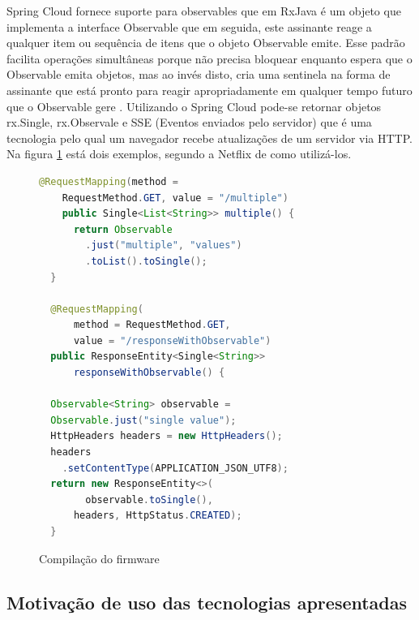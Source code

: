 \documentclass[journal]{IEEEtran}
\begin{document}
Spring Cloud fornece suporte para observables que em RxJava é um objeto que implementa a interface Observable que em seguida, este assinante reage a qualquer item ou sequência de itens que o objeto Observable emite. Esse padrão facilita operações simultâneas porque não precisa bloquear enquanto espera que o Observable emita objetos, mas ao invés disto, cria uma sentinela na forma de assinante que está pronto para reagir apropriadamente em qualquer tempo futuro que o Observable gere \cite{reactivex2017}. Utilizando o Spring Cloud pode-se retornar objetos rx.Single, rx.Observale e SSE (Eventos enviados pelo servidor) que é uma tecnologia pelo qual um navegador recebe atualizações de um servidor via HTTP. Na figura \ref{alg:vintedois} está dois exemplos, segundo a Netflix \cite{netflix2017SpringCloud} de como utilizá-los.

\begin{figure}[h]
\centering

\begin{lstlisting}[language=Java]
  @RequestMapping(method =
    RequestMethod.GET, value = "/multiple")
    public Single<List<String>> multiple() {
      return Observable
        .just("multiple", "values")
        .toList().toSingle();
  }

  @RequestMapping(
      method = RequestMethod.GET, 
      value = "/responseWithObservable")
  public ResponseEntity<Single<String>> 
      responseWithObservable() {

  Observable<String> observable = 
  Observable.just("single value");
  HttpHeaders headers = new HttpHeaders();
  headers
    .setContentType(APPLICATION_JSON_UTF8);
  return new ResponseEntity<>(
        observable.toSingle(), 
      headers, HttpStatus.CREATED);
  }
\end{lstlisting}

\caption{Compilação do firmware}
\label{alg:vintedois}
\end{figure}

\subsection{Motivação de uso das tecnologias apresentadas}
\end{document}
